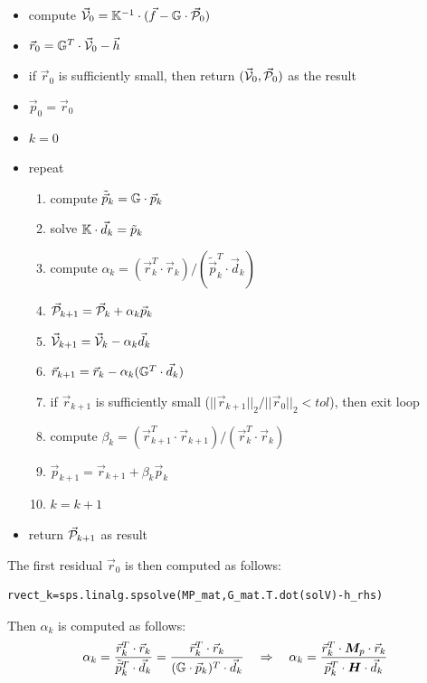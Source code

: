 \begin{itemize}
\item compute $\vec{\cal V}_0={\mathbb{K}}^{-1}\cdot (\vec{f}-{\mathbb{G}} \cdot \vec{\cal P}_0)$
\item {\color{purple} $\vec{r}_0 = {\mathbb{G}}^T\cdot \vec{\cal V}_0 - \vec{h}$} 
\item if $\vec{r}_0$ is sufficiently small, then return $(\vec{\cal V}_0,\vec{\cal P}_0)$ as the result
\item $\vec{p}_0=\vec{r}_0$
\item $k=0$
\item repeat
\begin{enumerate}
\item compute $\tilde{\vec{p}}_k = {\mathbb{G}} \cdot \vec{p}_k$
\item solve ${\mathbb{K}}\cdot \vec{d}_k = \tilde{p}_k$
\item compute {\color{purple} $\alpha_k=(\vec{r}_k^T \cdot  \vec{r}_k)/(\tilde{\vec{p}}_k^T \cdot \vec{d}_k)$}
\item $\vec{\cal P}_{k+1} = \vec{\cal P}_k+\alpha_k \vec{p}_k$
\item $ \vec{\cal V}_{k+1} = \vec{\cal V}_k - \alpha_k \vec{d}_k$
\item {\color{purple} $\vec{r}_{k+1} = \vec{r}_k - \alpha_k ({\mathbb{G}}^T \cdot \vec{d}_k ) $}
\item if $\vec{r}_{k+1}$ is sufficiently small ($||\vec{r}_{k+1}||_2/||\vec{r}_0||_2 <tol$), then exit loop
\item compute {\color{purple} $\beta_k=(\vec{r}_{k+1}^T \cdot \vec{r}_{k+1})/(\vec{r}_k^T \cdot \vec{r}_k)$}
\item $\vec{p}_{k+1} =\vec{r}_{k+1}+ \beta_k \vec{p}_k$
\item $k=k+1$
\end{enumerate}
\item return $\vec{\cal P}_{k+1}$ as result
\end{itemize}

The first residual $\vec{r}_0$ is then computed as follows:
\begin{lstlisting}
rvect_k=sps.linalg.spsolve(MP_mat,G_mat.T.dot(solV)-h_rhs) 
\end{lstlisting}
Then $\alpha_k$ is computed as follows:
\[
\alpha_k
= \frac{ \vec{r}_k^T \cdot  \vec{r}_k } { \tilde{\vec{p}}_k^T \cdot \vec{d}_k }
= \frac{ \vec{r}_k^T \cdot  \vec{r}_k } {({\mathbb{G}} \cdot  \vec{p}_k)^T \cdot \vec{d}_k }
\quad
\Rightarrow
\quad
\alpha_k
= \frac{ \vec{r}_k^T \cdot {\bm M}_p \cdot \vec{r}_k } {\vec{p}_k^T \cdot {\bm H} \cdot \vec{d}_k }
\]

